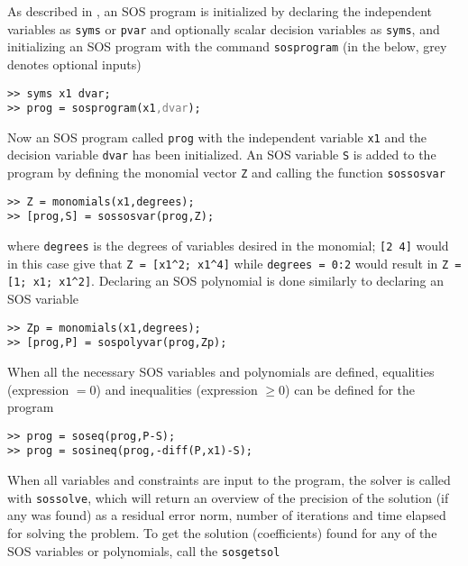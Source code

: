 
As described in \citep{bib:sostools_manual}, an SOS program is initialized by declaring the independent variables as \texttt{syms} or \texttt{pvar} and optionally scalar decision variables as \texttt{syms}, and initializing an SOS program with the command \texttt{sosprogram} (in the below, grey denotes optional inputs)

\hspace*{1cm} \texttt{>> syms x1 dvar;}\\
\hspace*{1cm} \texttt{>> prog = sosprogram(x1\textcolor{grey}{,dvar});}

Now an SOS program called \texttt{prog} with the independent variable \texttt{x1} and the decision variable \texttt{dvar} has been initialized. An SOS variable \texttt{S} is added to the program by defining the monomial vector \texttt{Z} and calling the function \texttt{sossosvar}

\hspace*{1cm} \texttt{>> Z = monomials(x1,degrees);}\\
\hspace*{1cm} \texttt{>> [prog,S] = sossosvar(prog,Z);}

where \texttt{degrees} is the degrees of variables desired in the monomial; \texttt{[2 4]} would in this case give that \verb|Z = [x1^2; x1^4]| while \texttt{degrees = 0:2} would result in \verb|Z = [1; x1; x1^2]|. Declaring an SOS polynomial is done similarly to declaring an SOS variable

\hspace*{1cm} \texttt{>> Zp = monomials(x1,degrees);}\\
\hspace*{1cm} \texttt{>> [prog,P] = sospolyvar(prog,Zp);}

When all the necessary SOS variables and polynomials are defined, equalities (expression $=0$) and inequalities (expression $\geq 0$) can be defined for the program

\hspace*{1cm} \texttt{>> prog = soseq(prog,P-S);}\\
\hspace*{1cm} \texttt{>> prog = sosineq(prog,-diff(P,x1)-S);}

When all variables and constraints are input to the program, the solver is called with \texttt{sossolve}, which will return an overview of the precision of the solution (if any was found) as a residual error norm, number of iterations and time elapsed for solving the problem. To get the solution (coefficients) found for any of the SOS variables or polynomials, call the \texttt{sosgetsol}

